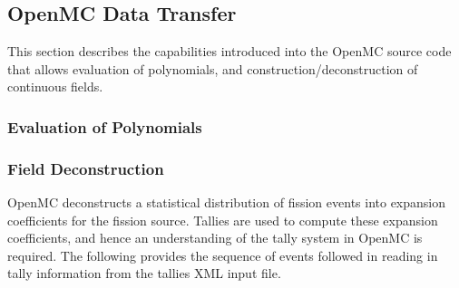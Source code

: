 \documentclass[10pt]{article}
\numberwithin{equation}{section} %
\begin{document}
\subsection{OpenMC Data Transfer}
This section describes the capabilities introduced into the OpenMC source code that allows evaluation of polynomials, and construction/deconstruction of continuous fields. 

\subsubsection{Evaluation of Polynomials}

\subsubsection{Field Deconstruction}
OpenMC deconstructs a statistical distribution of fission events into expansion coefficients for the fission source. Tallies are used to compute these expansion coefficients, and hence an understanding of the tally system in OpenMC is required. The following provides the sequence of events followed in reading in tally information from the tallies XML input file.
\end{document}
